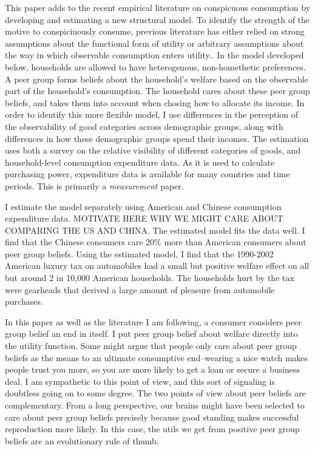 \documentclass[12pt]{article}
\begin{document}
This paper adds to the recent empirical literature on conspicuous consumption by developing and estimating a new structural model.  To identify the strength of the motive to conspiciuously consume, previous literature has either relied on strong assumptions about the functional form of utility or arbitrary assumptions about the way in which observable consumption enters utility.\citep{heffetz2011, perez2013measuring}.  In the model developed below, households are allowed to have heterogenous, non-homethetic preferences.  A peer group forms beliefs about the household's welfare based on the observable part of the household's consumption.  The household cares about these peer group beliefs, and takes them into account when chosing how to allocate its income.  In order to identify this more flexible model, I use differences in the perception of the observability of good categories across demographic groups, along with differences in how these demographic groups spend their incomes. The estimation uses both a survey on the relative visibility of different categories of goods, and household-level consumption expenditure data.  As it is used to calculate purchasing power, expenditure data is available for many countries and time periods.  This is primarily a \emph{measurement} paper.

I estimate the model separately using American and Chinese consumption expenditure data.  MOTIVATE HERE WHY WE MIGHT CARE ABOUT COMPARING THE US AND CHINA.  The estimated model fits the data well.  I find that the Chinese consumers care 20\% more than American consumers about peer group beliefs.  Using the estimated model, I find that the 1990-2002 American luxury tax on automobiles had a small but positive welfare effect on all but around 2 in 10,000 American households.  The households hurt by the tax were gearheads that derived a large amount of pleasure from automobile purchases.

In this paper as well as the literature I am following, a consumer considers peer group belief an end in itself.  I put peer group belief about welfare directly into the utility function.  Some might argue that people only care about peer group beliefs as the means to an ultimate consumptive end--wearing a nice watch makes people trust you more, so you are more likely to get a loan or secure a business deal.  I am sympathetic to this point of view, and this sort of signaling is doubtless going on to some degree.  The two points of view about peer beliefs are complementary.  From a long perspective, our brains might have been selected to care about peer group beliefs precisely because good standing makes successful reproduction more likely. In this case, the utils we get from positive peer group beliefs are an evolutionary rule of thumb.\citep{RobsonSamuelson2010}
\end{document}
